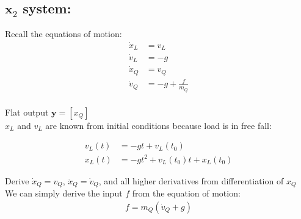 \documentclass[11pt]{article}
\begin{document}
\subsection{$\mathbf{x}_2$ system:}

Recall the equations of motion:
\begin{align*}
\dot{x}_L &= v_L \\
\dot{v}_L &= -g \\ 
\dot{x}_Q &= v_Q \\
\dot{v}_Q &= -g + \frac{f}{m_Q} \\
\end{align*}


Flat output $\mathbf{y} = [{x}_Q]$  \\

\mbox{} \newline
${x}_L$ and ${v}_L$ are known from initial conditions because load is in free fall:

\begin{align*}
v_L(t) &= -gt + v_L(t_0) \\
x_L(t) &= -gt^2 + v_L(t_0)t + x_L(t_0) 
\end{align*}

Derive $\dot{x}_Q = v_{Q}$, $\ddot{x}_Q = \dot{v}_{Q}$, and all higher derivatives from differentiation of $x_Q$ \\
We can simply derive the input $f$ from the equation of motion:
\begin{align*}
f = m_Q (\dot{v}_Q + g)
\end{align*}
\end{document}
